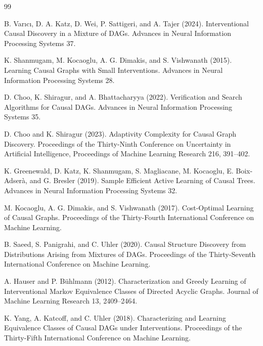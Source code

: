 \documentclass{article}
\begin{document}
\begin{thebibliography}{99}

   B. Varıcı, D. A. Katz, D. Wei, P. Sattigeri, and A. Tajer (2024). Interventional Causal Discovery in a Mixture of DAGs. Advances in Neural Information Processing Systems 37.

   K. Shanmugam, M. Kocaoglu, A. G. Dimakis, and S. Vishwanath (2015). Learning Causal Graphs with Small Interventions. Advances in Neural Information Processing Systems 28.

   D. Choo, K. Shiragur, and A. Bhattacharyya (2022). Verification and Search Algorithms for Causal DAGs. Advances in Neural Information Processing Systems 35.

   D. Choo and K. Shiragur (2023). Adaptivity Complexity for Causal Graph Discovery. Proceedings of the Thirty-Ninth Conference on Uncertainty in Artificial Intelligence, Proceedings of Machine Learning Research 216, 391--402.

   K. Greenewald, D. Katz, K. Shanmugam, S. Magliacane, M. Kocaoglu, E. Boix-Adserà, and G. Bresler (2019). Sample Efficient Active Learning of Causal Trees. Advances in Neural Information Processing Systems 32.

   M. Kocaoglu, A. G. Dimakis, and S. Vishwanath (2017). Cost-Optimal Learning of Causal Graphs. Proceedings of the Thirty-Fourth International Conference on Machine Learning.

   B. Saeed, S. Panigrahi, and C. Uhler (2020). Causal Structure Discovery from Distributions Arising from Mixtures of DAGs. Proceedings of the Thirty-Seventh International Conference on Machine Learning.

   A. Hauser and P. Bühlmann (2012). Characterization and Greedy Learning of Interventional Markov Equivalence Classes of Directed Acyclic Graphs. Journal of Machine Learning Research 13, 2409--2464.

   K. Yang, A. Katcoff, and C. Uhler (2018). Characterizing and Learning Equivalence Classes of Causal DAGs under Interventions. Proceedings of the Thirty-Fifth International Conference on Machine Learning.


\end{thebibliography}
\end{document}
